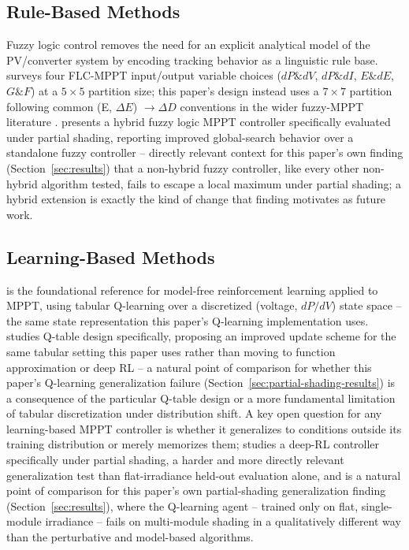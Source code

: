 \subsection{Rule-Based Methods}
Fuzzy logic control removes the need for an explicit analytical model of
the PV/converter system by encoding tracking behavior as a linguistic rule
base. \cite{zhu2021comprehensive} surveys four FLC-MPPT input/output
variable choices ($dP\&dV$, $dP\&dI$, $E\&dE$, $G\&F$) at a $5\times5$
partition size; this paper's design instead uses a $7\times7$ partition
following common (E, $\Delta E$) $\to \Delta D$ conventions in the wider
fuzzy-MPPT literature \cite{fapi2025fuzzy}. \cite{sunkara2024novel} presents a hybrid fuzzy
logic MPPT controller specifically evaluated under partial shading,
reporting improved global-search behavior over a standalone fuzzy
controller -- directly relevant context for this paper's own finding
(Section~\ref{sec:results}) that a non-hybrid fuzzy controller, like every
other non-hybrid algorithm tested, fails to escape a local maximum under
partial shading; a hybrid extension is exactly the kind of change that
finding motivates as future work.

\subsection{Learning-Based Methods}
\cite{kofinas2017reinforcement} is the foundational reference for
model-free reinforcement learning applied to MPPT, using tabular Q-learning
over a discretized (voltage, $dP/dV$) state space -- the same state
representation this paper's Q-learning implementation uses.
\cite{chen2023research} studies Q-table design specifically, proposing an
improved update scheme for the same tabular setting this paper uses rather
than moving to function approximation or deep RL -- a natural point of
comparison for whether this paper's Q-learning generalization failure
(Section~\ref{sec:partial-shading-results}) is a consequence of the
particular Q-table design or a more fundamental limitation of tabular
discretization under distribution shift. A key open question for any
learning-based MPPT controller is whether it generalizes to conditions
outside its training distribution or merely memorizes them;
\cite{phan2020deep} studies a deep-RL controller specifically under partial
shading, a harder and more directly relevant generalization test than
flat-irradiance held-out evaluation alone, and is a natural point of
comparison for this paper's own partial-shading generalization finding
(Section~\ref{sec:results}), where the Q-learning agent -- trained only on
flat, single-module irradiance -- fails on multi-module shading in a
qualitatively different way than the perturbative and model-based
algorithms.

